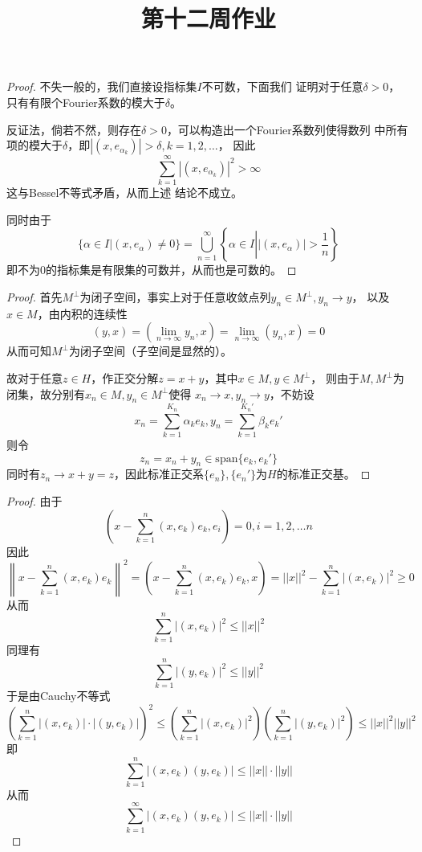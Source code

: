 \documentclass[cn]{homework}
\title{第十二周作业}
\begin{document}
    \maketitle

    \problem

    \problem

    \problem
    \begin{proof}
        不失一般的，我们直接设指标集$I$不可数，下面我们
        证明对于任意$\delta>0$，只有有限个Fourier系数的模大于$\delta$。

        反证法，倘若不然，则存在$\delta>0$，可以构造出一个Fourier系数列使得数列
        中所有项的模大于$\delta$，即$|(x,e_{\alpha_k})|>\delta,k=1,2,\ldots$，
        因此
        \[\sum_{k=1}^\infty|(x,e_{\alpha_k})|^2>\infty\]
        这与Bessel不等式矛盾，从而上述
        结论不成立。

        同时由于
        \[\{\alpha\in I|(x,e_\alpha)\neq 0\}
        =\bigcup_{n=1}^\infty\left\{\alpha\in I\left||(x,e_\alpha)|>\frac{1}{n}\right.\right\}\]
        即不为0的指标集是有限集的可数并，从而也是可数的。
    \end{proof}

    \problem
    \begin{proof}
        首先$M^\perp$为闭子空间，事实上对于任意收敛点列$y_n\in M^\perp,y_n\to y$，
        以及$x\in M$，由内积的连续性
        \[(y,x)=\left(\lim_{n\to\infty}y_n,x\right)
        =\lim_{n\to\infty}(y_n,x)=0\]
        从而可知$M^\perp$为闭子空间（子空间是显然的）。

        故对于任意$z\in H$，作正交分解$z=x+y$，其中$x\in M,y\in M^\perp$，
        则由于$M,M^\perp$为闭集，故分别有$x_n\in M,y_n\in M^\perp$使得
        $x_n\to x,y_n\to y$，不妨设
        \[x_n=\sum_{k=1}^{K_n}\alpha_ke_k,
        y_n=\sum_{k=1}^{K_n'}\beta_ke_k'\]
        则令
        \[z_n=x_n+y_n\in\mathrm{span}\{e_k,e_k'\}\]
        同时有$z_n\to x+y=z$，因此标准正交系$\{e_n\},\{e_n'\}$为$H$的标准正交基。
    \end{proof}

    \problem
    \begin{proof}
        由于
        \[\left(x-\sum_{k=1}^n(x,e_k)e_k,e_i\right)=0,i=1,2,\ldots n\]
        因此
        \[\left\|x-\sum_{k=1}^n(x,e_k)e_k\right\|^2
        =\left(x-\sum_{k=1}^n(x,e_k)e_k,x\right)
        =||x||^2-\sum_{k=1}^n|(x,e_k)|^2\geq 0\]
        从而
        \[\sum_{k=1}^n|(x,e_k)|^2\leq ||x||^2\]
        同理有
        \[\sum_{k=1}^n|(y,e_k)|^2\leq ||y||^2\]
        于是由Cauchy不等式
        \[\left(\sum_{k=1}^n|(x,e_k)|\cdot|(y,e_k)|\right)^2
        \leq
        \left(\sum_{k=1}^n|(x,e_k)|^2\right)
        \left(\sum_{k=1}^n|(y,e_k)|^2\right)
        \leq ||x||^2||y||^2\]
        即
        \[\sum_{k=1}^n|(x,e_k)(y,e_k)|\leq
        ||x||\cdot||y||\]
        从而
        \[\sum_{k=1}^\infty|(x,e_k)(y,e_k)|\leq ||x||\cdot||y||\]


    \end{proof}
\end{document}
